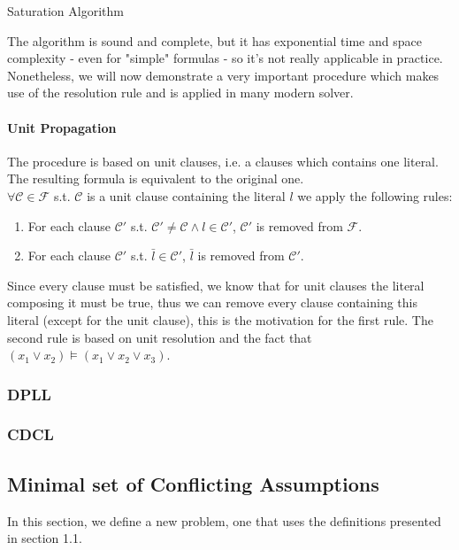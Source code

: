 \documentclass[]{article}
\begin{document}
	\begin{algorithm}[H]
	\caption{Saturation Algorithm}
	\end{algorithm}
	The algorithm is sound and complete, but it has exponential time and space complexity - even for "simple" formulas - so it's not really applicable in practice. Nonetheless, we will now demonstrate a very important procedure which makes use of the resolution rule and is applied in many modern solver.
	\paragraph{Unit Propagation} The procedure is based on unit clauses, i.e. a clauses which contains one literal. The resulting formula is equivalent to the original one.\\
	$\forall \mathcal{C} \in \mathcal{F} $ s.t. $ \mathcal{C} $ is a unit clause containing the literal $l$ we apply the following rules:
	\begin{enumerate}
		\item For each clause $\mathcal{C'} $ s.t. $ \mathcal{C'} \neq \mathcal{C} \land l \in \mathcal{C'} $, $\mathcal{C'} $ is removed from $\mathcal{F} $.
		\item For each clause $\mathcal{C'} $ s.t. $\bar{l} \in \mathcal{C'} $, $\bar{l}$ is removed from $\mathcal{C'} $.
	\end{enumerate}
	Since every clause must be satisfied, we know that for unit clauses the literal composing it must be true, thus we can remove every clause containing this literal (except for the unit clause), this is the motivation for the first rule. The second rule is based on unit resolution and the fact that $ (x_1 \lor x_2) \vDash (x_1 \lor x_2 \lor x_3) $.
	
	\subsubsection{DPLL}
	\subsubsection{CDCL}
	\subsection{Minimal set of Conflicting Assumptions}
	In this section, we define a new problem, one that uses the definitions presented in section 1.1.
\end{document}
